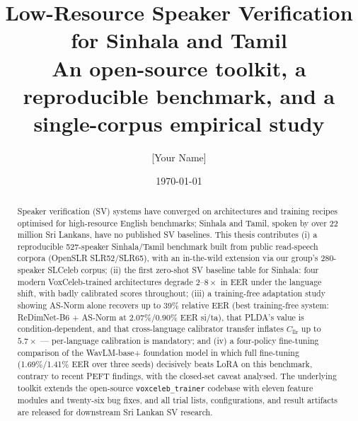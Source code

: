 \documentclass[12pt,a4paper,openany]{report}
\title{Low-Resource Speaker Verification for Sinhala and Tamil\\
\large An open-source toolkit, a reproducible benchmark, and a
single-corpus empirical study}
\author{[Your Name]}
\date{\today}
\begin{document}
\maketitle

\begin{abstract}
\noindent
Speaker verification (SV) systems have converged on architectures and
training recipes optimised for high-resource English benchmarks;
Sinhala and Tamil, spoken by over 22 million Sri Lankans, have no
published SV baselines. This thesis contributes (i) a reproducible
527-speaker Sinhala/Tamil benchmark built from public read-speech
corpora (OpenSLR SLR52/SLR65), with an in-the-wild extension via our
group's 280-speaker SLCeleb corpus; (ii) the first zero-shot SV
baseline table for Sinhala: four modern VoxCeleb-trained
architectures degrade $2$--$8\times$ in EER under the language shift,
with badly calibrated scores throughout; (iii) a training-free
adaptation study showing AS-Norm alone recovers up to 39\% relative EER
(best training-free system: ReDimNet-B6 + AS-Norm at 2.07\%/0.90\%
EER si/ta), that PLDA's value is condition-dependent, and that
cross-language calibrator transfer inflates $C_{\mathrm{llr}}$ up to
$5.7\times$ — per-language calibration is mandatory; and (iv) a
four-policy fine-tuning comparison of the WavLM-base+ foundation
model in which full fine-tuning (1.69\%/1.41\% EER over three seeds)
decisively beats LoRA on this benchmark, contrary to recent PEFT
findings, with the closed-set caveat analysed. The underlying
toolkit extends the open-source \texttt{voxceleb\_trainer} codebase
with eleven feature modules and twenty-six bug fixes, and all trial
lists, configurations, and result artifacts are released for
downstream Sri Lankan SV research.
\end{abstract}

\tableofcontents






% 

% 



\end{document}
